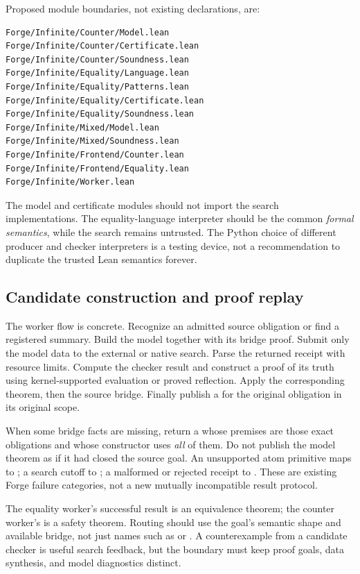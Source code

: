 Proposed module boundaries, not existing declarations, are:
\begin{lstlisting}
Forge/Infinite/Counter/Model.lean
Forge/Infinite/Counter/Certificate.lean
Forge/Infinite/Counter/Soundness.lean
Forge/Infinite/Equality/Language.lean
Forge/Infinite/Equality/Patterns.lean
Forge/Infinite/Equality/Certificate.lean
Forge/Infinite/Equality/Soundness.lean
Forge/Infinite/Mixed/Model.lean
Forge/Infinite/Mixed/Soundness.lean
Forge/Infinite/Frontend/Counter.lean
Forge/Infinite/Frontend/Equality.lean
Forge/Infinite/Worker.lean
\end{lstlisting}
The model and certificate modules should not import the search implementations.
The equality-language interpreter should be the common \emph{formal semantics},
while the search remains untrusted. The Python choice of different producer and
checker interpreters is a testing device, not a recommendation to duplicate the
trusted Lean semantics forever.

\subsection{Candidate construction and proof replay}
The worker flow is concrete. Recognize an admitted source obligation or find a
registered summary. Build the model together with its bridge proof. Submit only
the model data to the external or native search. Parse the returned receipt
with resource limits. Compute the checker result and construct a proof of its
truth using kernel-supported evaluation or proved reflection. Apply the
corresponding  theorem, then the source bridge.
Finally publish a  for the original obligation in its original
scope.

When some bridge facts are missing, return a  whose
premises are those exact obligations and whose constructor uses \emph{all}
of them. Do not publish the model theorem as if it had closed the source goal.
An unsupported atom primitive maps to ; a search
cutoff to ; a malformed or rejected receipt to
. These are existing Forge failure categories, not a
new mutually incompatible result protocol.

The equality worker's successful result is an equivalence theorem; the counter
worker's is a safety theorem. Routing should use the goal's semantic shape and
available bridge, not just names such as  or . A
counterexample from a candidate checker is useful search feedback, but the
boundary must keep proof goals, data synthesis, and model diagnostics distinct.

